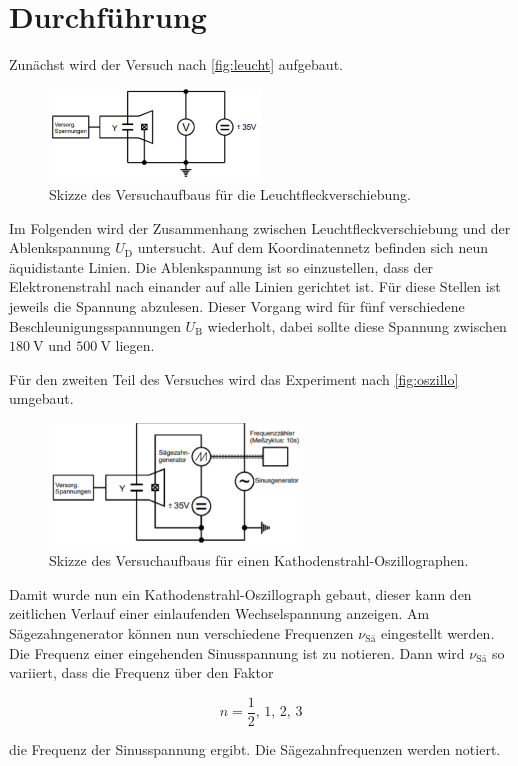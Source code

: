 \section{Durchführung}
\label{sec:Durchführung}


Zunächst wird der Versuch nach \autoref{fig:leucht} aufgebaut.

\begin{figure}
    \centering
    \includegraphics[width=0.5\textwidth]{images/bild3.png}
    \caption{Skizze des Versuchaufbaus für die Leuchtfleckverschiebung.\cite{V501}}
    \label{fig:leucht}
\end{figure}

Im Folgenden wird der Zusammenhang zwischen Leuchtfleckverschiebung und der Ablenkspannung $U_\text{D}$ untersucht.
Auf dem Koordinatennetz befinden sich neun äquidistante Linien.
Die Ablenkspannung ist so einzustellen, dass der Elektronenstrahl nach einander auf alle Linien gerichtet ist.
Für diese Stellen ist jeweils die Spannung abzulesen.
Dieser Vorgang wird für fünf verschiedene Beschleunigungsspannungen $U_\text{B}$ wiederholt, dabei sollte diese Spannung zwischen $\SI{180}{\volt}$ und $\SI{500}{\volt}$ liegen.

Für den zweiten Teil des Versuches wird das Experiment nach \autoref{fig:oszillo} umgebaut.

\begin{figure}
    \centering
    \includegraphics[width=0.6\textwidth]{images/bild4.png}
    \caption{Skizze des Versuchaufbaus für einen Kathodenstrahl-Oszillographen.\cite{V501}}
    \label{fig:oszillo}
\end{figure}

Damit wurde nun ein Kathodenstrahl-Oszillograph gebaut, dieser kann den zeitlichen Verlauf einer einlaufenden Wechselspannung anzeigen.
Am Sägezahngenerator können nun verschiedene Frequenzen $\nu _\text{Sä}$ eingestellt werden.
Die Frequenz einer eingehenden Sinusspannung ist zu notieren.
Dann wird $\nu _\text{Sä}$ so variiert, dass die Frequenz über den Faktor  

\begin{equation}
    n = \frac{1}{2}, \, 1, \, 2, \, 3
\end{equation}

die Frequenz der Sinusspannung ergibt. 
Die Sägezahnfrequenzen werden notiert.
